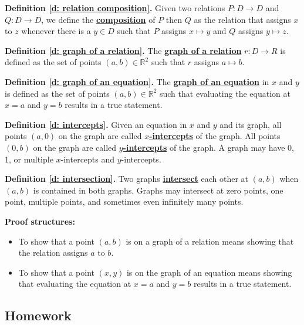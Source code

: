 \documentclass[11pt]{article}
\newcommand{\R}{\mathbb{R}}
\renewcommand\emph[1]{\underline{\bf{#1}}} %
\theoremstyle{definition}
\begin{document}
\vfill 

{\bf Definition \ref{d: relation composition}.}
Given two relations $P:D\to D$ and $Q:D\to D$, we define the \emph{composition} of $P$ then $Q$ 
as the relation that assigns $x$ to $z$ whenever there is a $y\in D$ such that $P$ assigns $x\mapsto y$ and $Q$ assigns $y\mapsto z$.

\vfill
{\bf Definition \ref{d: graph of a relation}.}
The \emph{graph of a relation} $r:D\to R$ is defined as the set of points $(a, b)\in \R^2$ such that $r$ assigns $a\mapsto b$.

{\bf Definition \ref{d: graph of an equation}.}
The \emph{graph of an equation} in $x$ and $y$ is defined as the set of points $(a, b) \in \R^2$ such that evaluating the equation at $x=a$ and $y=b$ results in a true statement.

\vfill

{\bf Definition \ref{d: intercepts}.}
Given an equation in $x$ and $y$ and its graph, all points $(a,0)$ on the graph are called \emph{$x$-intercepts} of the graph. All points $(0,b)$ on the graph are called \emph{$y$-intercepts} of the graph. A graph may have 0, 1, or multiple $x$-intercepts and $y$-intercepts.

\vfill
{\bf Definition \ref{d: intersection}.}
Two graphs \emph{intersect} each other at $(a,b)$ when $(a,b)$ is contained in both graphs.  Graphs may intersect at zero points, one point, multiple points, and sometimes even infinitely many points.

\vfill
{\bf Proof structures:}
\begin{itemize}
\item To show that a point $(a, b)$ is on a graph of a relation means showing that the relation assigns $a$ to $b$.

\item To show that a point $(x, y)$ is on the graph of an equation means showing that evaluating the equation at $x=a$ and $y=b$ results in a true statement.
\end{itemize}

\vfill 

\newpage \subsection{Homework}

\end{document}
